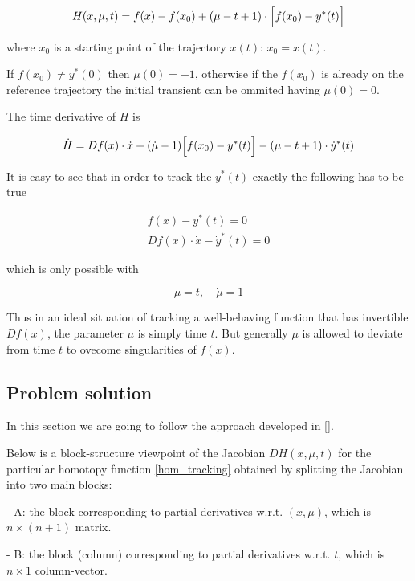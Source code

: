\documentclass[11pt,american]{article}
\begin{document}
\begin{equation}\label{hom_tracking}
H(x,\mu, t) = f(x) - f(x_0) + (\mu - t + 1) \cdot \Bigl[ f(x_0) - y^*(t) \Bigr] 
\end{equation}

where $x_0$ is a starting point of the trajectory $x(t)$: $x_0=x(t)$.

If $f(x_0) \ne y^*(0)$ then $\mu(0) = -1$, otherwise if the $f(x_0)$ is already on the reference trajectory the initial transient can be ommited having $\mu(0)=0$.

The time derivative of $H$ is

\begin{equation}\label{diff_hom_tracking}
\dot H = D f(x) \cdot \dot x + (\dot {\mu} - 1)\Bigl[ f(x_0) - y^*(t) \Bigr] - (\mu - t + 1) \cdot \dot y^*(t)
\end{equation}

It is easy to see that in order to track the $y^*(t)$ exactly the following has to be true 

\begin{gather}
f(x) - y^*(t) = 0 \\
D f(x) \cdot \dot x - \dot y^*(t) = 0
\end{gather}

which is only possible with

\begin{equation}\label{tracking_conditions}
\mu = t, \quad \dot {\mu} = 1
\end{equation}

Thus in an ideal situation of tracking a well-behaving function that has invertible $D f(x)$, the parameter $\mu$ is simply time $t$.
But generally $\mu$ is allowed to deviate from time $t$ to ovecome singularities of $f(x)$.

\subsection{Problem solution}

In this section we are going to follow the approach developed in [].

Below is a block-structure viewpoint of the Jacobian $D H(x,\mu,t)$ for the particular homotopy function \eqref{hom_tracking} obtained by splitting the Jacobian into two main blocks:  

- A: the block corresponding to partial derivatives w.r.t. $(x,\mu)$, which is $n \times (n+1)$ matrix.  

- B: the block (column) corresponding to partial derivatives w.r.t. $t$, which is $n \times 1$ column-vector.
\end{document}
